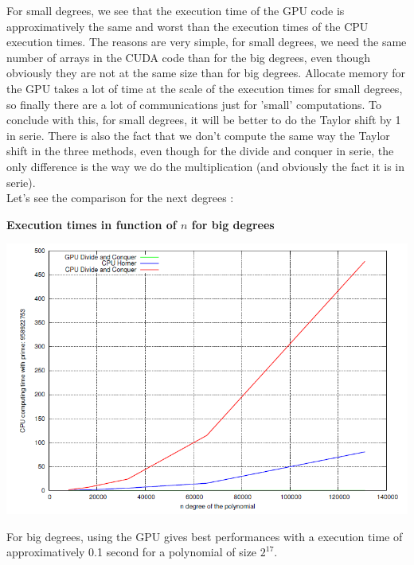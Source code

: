 For small degrees, we see that the execution time of the GPU code is approximatively the same and worst than the execution times of the CPU execution times. The reasons are very simple, for small degrees, we need the same number of arrays in the CUDA code than for the big degrees, even though obviously they are not at the same size than for big degrees. Allocate memory for the GPU takes a lot of time at the scale of the execution times for small degrees, so finally there are a lot of communications just for 'small' computations. To conclude with this, for small degrees, it will be better to do the Taylor shift by 1 in serie. There is also the fact that we don't compute the same way the Taylor shift in the three methods, even though for the divide and conquer in serie, the only difference is the way we do the multiplication (and obviously the fact it is in serie).\\

Let's see the comparison for the next degrees :\\

\begin{center}
\textbf{Execution times in function of $n$ for big degrees}\\
\end{center}

\begin{center}
\includegraphics[scale=0.8]{eps/time_big_n.png}
\end{center}

For big degrees, using the GPU gives best performances with a execution time of approximatively 0.1 second for a polynomial of size $2^{17}$.
